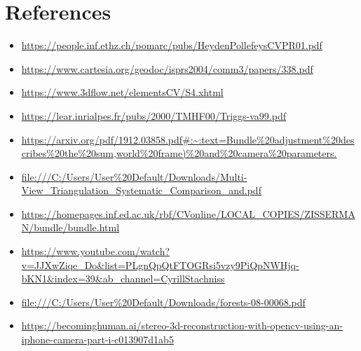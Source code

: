 \documentclass{article}[11pt]
\begin{document}
\section{References}
\begin{itemize}
    \item \url{https://people.inf.ethz.ch/pomarc/pubs/HeydenPollefeysCVPR01.pdf}

    \item \url{https://www.cartesia.org/geodoc/isprs2004/comm3/papers/338.pdf}
    \item \url{https://www.3dflow.net/elementsCV/S4.xhtml}
    \item \url{https://lear.inrialpes.fr/pubs/2000/TMHF00/Triggs-va99.pdf}
    \item \url{https://arxiv.org/pdf/1912.03858.pdf#:~:text=Bundle\%20adjustment\%20describes\%20the\%20sum,world\%20frame)\%20and\%20camera\%20parameters.}
    \item \url{file:///C:/Users/User\%20Default/Downloads/Multi-View_Triangulation_Systematic_Comparison_and.pdf}
    \item \url{https://homepages.inf.ed.ac.uk/rbf/CVonline/LOCAL_COPIES/ZISSERMAN/bundle/bundle.html}
    \item \url{https://www.youtube.com/watch?v=JJXwZiqe_Do&list=PLgnQpQtFTOGRsi5vzy9PiQpNWHjq-bKN1&index=39&ab_channel=CyrillStachniss}
    \item \url{file:///C:/Users/User\%20Default/Downloads/forests-08-00068.pdf}
    \item \url{https://becominghuman.ai/stereo-3d-reconstruction-with-opencv-using-an-iphone-camera-part-i-c013907d1ab5}


\end{itemize}
\end{document}
